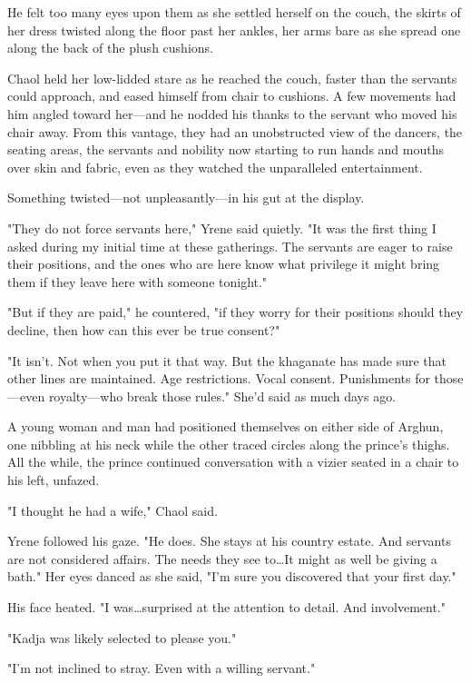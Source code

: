 He felt too many eyes upon them as she settled herself on the couch, the skirts of her dress twisted along the floor past her ankles, her arms bare as she spread one along the back of the plush cushions.

Chaol held her low-lidded stare as he reached the couch, faster than the servants could approach, and eased himself from chair to cushions.
A few movements had him angled toward her---and he nodded his thanks to the servant who moved his chair away.
From this vantage, they had an unobstructed view of the dancers, the seating areas, the servants and nobility now starting to run hands and mouths over skin and fabric, even as they watched the unparalleled entertainment.

Something twisted---not unpleasantly---in his gut at the display.

"They do not force servants here," Yrene said quietly.
"It was the first thing I asked during my initial time at these gatherings.
The servants are eager to raise their positions, and the ones who are here know what privilege it might bring them if they leave here with someone tonight."

"But if they are paid," he countered, "if they worry for their positions should they decline, then how can this ever be true consent?"

"It isn't.
Not when you put it that way.
But the khaganate has made sure that other lines are maintained.
Age restrictions.
Vocal consent.
Punishments for those---even royalty---who break those rules."
She'd said as much days ago.

A young woman and man had positioned themselves on either side of Arghun, one nibbling at his neck while the other traced circles along the prince's thighs.
All the while, the prince continued conversation with a vizier seated in a chair to his left, unfazed.

"I thought he had a wife," Chaol said.

Yrene followed his gaze.
"He does.
She stays at his country estate.
And servants are not considered affairs.
The needs they see to\ldots It might as well be giving a bath."
Her eyes danced as she said, "I'm sure you discovered that your first day."

His face heated.
"I was\ldots surprised at the attention to detail.
And involvement."

"Kadja was likely selected to please you."

"I'm not inclined to stray.
Even with a willing servant."

